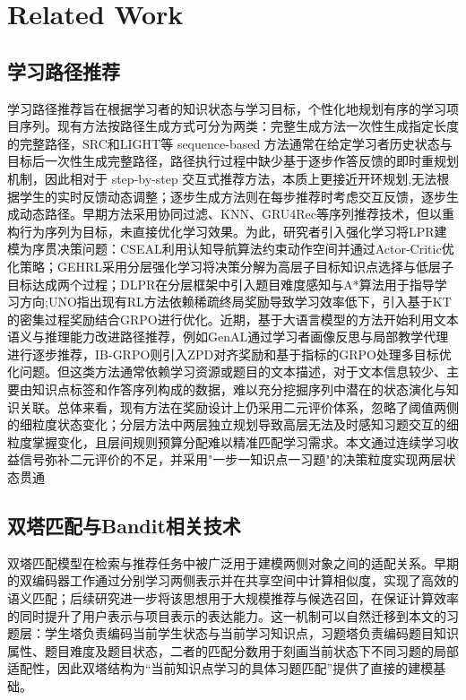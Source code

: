 \documentclass[11pt,a4paper]{article}
\begin{document}
\section{Related Work}
\subsection{学习路径推荐}
学习路径推荐旨在根据学习者的知识状态与学习目标，个性化地规划有序的学习项目序列\cite{nabizadeh2020learning}。现有方法按路径生成方式可分为两类：完整生成方法一次性生成指定长度的完整路径，SRC\cite{chen2023set}和LIGHT\cite{yu2025light}等 sequence-based 方法通常在给定学习者历史状态与目标后一次性生成完整路径，路径执行过程中缺少基于逐步作答反馈的即时重规划机制，因此相对于 step-by-step 交互式推荐方法，本质上更接近开环规划,无法根据学生的实时反馈动态调整；逐步生成方法则在每步推荐时考虑交互反馈，逐步生成动态路径。早期方法采用协同过滤、KNN、GRU4Rec等序列推荐技术\cite{cover1967nearest,hidasi2015session}，但以重构行为序列为目标，未直接优化学习效果。为此，研究者引入强化学习将LPR建模为序贯决策问题：CSEAL\cite{liu2019exploiting}利用认知导航算法约束动作空间并通过Actor-Critic\cite{sutton1999policy}优化策略；GEHRL\cite{li2023graph}采用分层强化学习将决策分解为高层子目标知识点选择与低层子目标达成两个过程；DLPR\cite{zhang2024item}在分层框架中引入题目难度感知与A*算法\cite{duchovn2014path}用于指导学习方向;UNO\cite{peng2026uno}指出现有RL方法依赖稀疏终局奖励导致学习效率低下，引入基于KT的密集过程奖励结合GRPO\cite{shao2024deepseekmath}进行优化。近期，基于大语言模型的方法开始利用文本语义与推理能力改进路径推荐，例如GenAL\cite{lv2025genal}通过学习者画像反思与局部教学代理进行逐步推荐，IB-GRPO\cite{wang2026ib}则引入ZPD对齐奖励和基于指标的GRPO处理多目标优化问题。但这类方法通常依赖学习资源或题目的文本描述，对于文本信息较少、主要由知识点标签和作答序列构成的数据，难以充分挖掘序列中潜在的状态演化与知识关联。总体来看，现有方法在奖励设计上仍采用二元评价体系，忽略了阈值两侧的细粒度状态变化；分层方法中两层独立规划导致高层无法及时感知习题交互的细粒度掌握变化，且层间规则预算分配难以精准匹配学习需求。本文通过连续学习收益信号弥补二元评价的不足，并采用"一步一知识点一习题"的决策粒度实现两层状态贯通
\subsection{双塔匹配与Bandit相关技术}
双塔匹配模型在检索与推荐任务中被广泛用于建模两侧对象之间的适配关系。早期的双编码器工作通过分别学习两侧表示并在共享空间中计算相似度，实现了高效的语义匹配\cite{huang2013learning}；后续研究进一步将该思想用于大规模推荐与候选召回，在保证计算效率的同时提升了用户表示与项目表示的表达能力\cite{covington2016deep,yi2019sampling}。这一机制可以自然迁移到本文的习题层：学生塔负责编码当前学生状态与当前学习知识点，习题塔负责编码题目知识属性、题目难度及题目状态\cite{shen2022assessing,zhang2024item}，二者的匹配分数用于刻画当前状态下不同习题的局部适配性，因此双塔结构为“当前知识点学习的具体习题匹配”提供了直接的建模基础。
\end{document}
